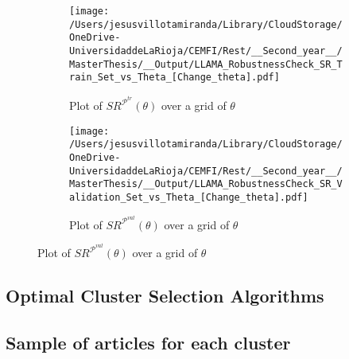 \begin{figure}[H]
  \centering

    \begin{subfigure}[b]{0.46\textwidth}
    \centering
    \texttt{[image: /Users/jesusvillotamiranda/Library/CloudStorage/OneDrive-UniversidaddeLaRioja/CEMFI/Rest/\_\_Second\_year\_\_/MasterThesis/\_\_Output/LLAMA\_RobustnessCheck\_SR\_Train\_Set\_vs\_Theta\_[Change\_theta].pdf]}
    \caption{Plot of $SR^{\mathcal P^{tr}}(\theta)$ over a grid of $\theta$}
    \label{fig:LLM_hyp_3}
  \end{subfigure}
  \hspace{0.05\textwidth} %
  \begin{subfigure}[b]{0.46\textwidth}
    \centering
    \texttt{[image: /Users/jesusvillotamiranda/Library/CloudStorage/OneDrive-UniversidaddeLaRioja/CEMFI/Rest/\_\_Second\_year\_\_/MasterThesis/\_\_Output/LLAMA\_RobustnessCheck\_SR\_Validation\_Set\_vs\_Theta\_[Change\_theta].pdf]}
    \caption{Plot of $SR^{\mathcal P^{val}}(\theta)$ over a grid of $\theta$}
    \label{fig:LLM_hyp_4}
  \end{subfigure}

\label{fig:LLM_hyperparameter_justification_theta}
\end{figure}





\newpage
\subsection{Optimal Cluster Selection Algorithms}








\subsection{Sample of articles for each cluster}
\setcounter{table}{0}
\renewcommand{\thetable}{A\arabic{table}} %

